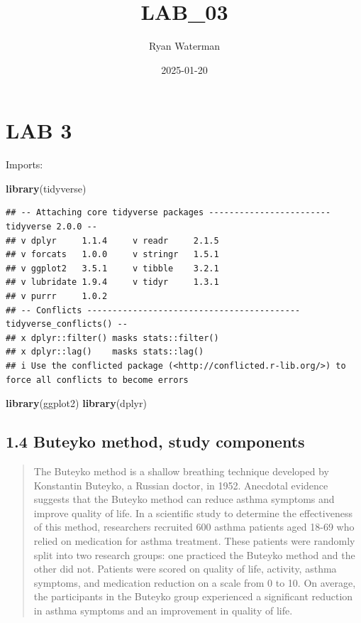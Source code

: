 \documentclass[
]{article}
\title{LAB\_03}
\author{Ryan Waterman}
\date{2025-01-20}
\newenvironment{Shaded}{\begin{snugshade}}{\end{snugshade}}
\newcommand{\FunctionTok}[1]{\textcolor[rgb]{0.13,0.29,0.53}{\textbf{#1}}}
\newcommand{\NormalTok}[1]{#1}
\begin{document}
\maketitle

\section{LAB 3}\label{lab-3}

Imports:

\begin{Shaded}
\begin{Highlighting}[]
\FunctionTok{library}\NormalTok{(tidyverse)}
\end{Highlighting}
\end{Shaded}

\begin{verbatim}
## -- Attaching core tidyverse packages ------------------------ tidyverse 2.0.0 --
## v dplyr     1.1.4     v readr     2.1.5
## v forcats   1.0.0     v stringr   1.5.1
## v ggplot2   3.5.1     v tibble    3.2.1
## v lubridate 1.9.4     v tidyr     1.3.1
## v purrr     1.0.2     
## -- Conflicts ------------------------------------------ tidyverse_conflicts() --
## x dplyr::filter() masks stats::filter()
## x dplyr::lag()    masks stats::lag()
## i Use the conflicted package (<http://conflicted.r-lib.org/>) to force all conflicts to become errors
\end{verbatim}

\begin{Shaded}
\begin{Highlighting}[]
\FunctionTok{library}\NormalTok{(ggplot2)}
\FunctionTok{library}\NormalTok{(dplyr)}
\end{Highlighting}
\end{Shaded}

\subsection{1.4 Buteyko method, study
components}\label{buteyko-method-study-components}

\begin{quote}
The Buteyko method is a shallow breathing technique developed by
Konstantin Buteyko, a Russian doctor, in 1952. Anecdotal evidence
suggests that the Buteyko method can reduce asthma symptoms and improve
quality of life. In a scientific study to determine the effectiveness of
this method, researchers recruited 600 asthma patients aged 18-69 who
relied on medication for asthma treatment. These patients were randomly
split into two research groups: one practiced the Buteyko method and the
other did not. Patients were scored on quality of life, activity, asthma
symptoms, and medication reduction on a scale from 0 to 10. On average,
the participants in the Buteyko group experienced a significant
reduction in asthma symptoms and an improvement in quality of life.
\end{quote}
\end{document}
